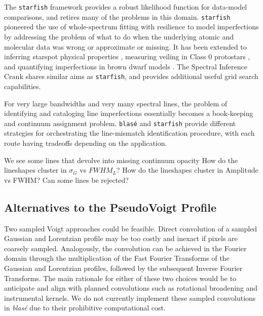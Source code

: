 \documentclass[modern]{aastex631}
\begin{document}
The \texttt{starfish} framework \citep{czekala15} provides a robust likelihood function for data-model comparisons, and retires many of the problems in this domain.  \texttt{starfish} pioneered the use of whole-spectrum fitting with resilience to model imperfections by addressing the problem of what to do when the underlying atomic and molecular data was wrong or approximate or missing.  It has been extended to inferring starspot physical properties \citep{2017ApJ...836..200G}, measuring veiling in Class 0 protostars \citep{2018ApJ...862...85G}, and quantifying imperfections in brown dwarf models \citep{2021ApJ...921...95Z}.  The Spectral Inference Crank \citep[\texttt{sick},][]{2016ApJS..223....8C} shares similar aims as \texttt{starfish}, and provides additional useful grid search capabilities.

For very large bandwidths and very many spectral lines, the problem of identifying and cataloging line imperfections essentially becomes a book-keeping and continuum assignment problem.  \texttt{blas\'e} and \texttt{starfish} provide different strategies for orchestrating the line-mismatch identification procedure, with each route having tradeoffs depending on the application.

\begin{outline}
    \1 We see some lines that devolve into missing continuum opacity
    \1 How do the lineshapes cluster in $\sigma_G$ vs $FWHM_L$?
    \1 How do the lineshapes cluster in Amplitude vs FWHM? Can some lines be rejected?
\end{outline}

\subsection{Alternatives to the PseudoVoigt Profile}
Two sampled Voigt approaches could be feasible. Direct convolution of a sampled Gaussian and Lorentzian profile may be too costly and inexact if pixels are coarsely sampled. Analogously, the convolution can be achieved in the Fourier domain through the multiplication of the Fast Fourier Transforms of the Gaussian and Lorentzian profiles, followed by the subsequent Inverse Fourier Transforms. The main rationale for either of these two choices would be to anticipate and align with planned convolutions such as rotational broadening and instrumental kernels. We do not currently implement these sampled convolutions in \emph{blas\'e} due to their prohibitive computational cost.
\end{document}
